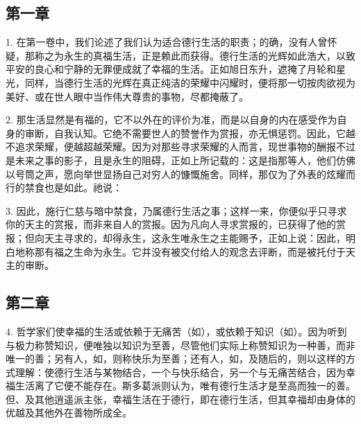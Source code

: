 \subsection{第一章}

\par

1. 在第一卷中，我们论述了我们认为适合德行生活的职责；的确，没有人曾怀疑，那称之为永生的真福生活，正是赖此而获得。德行生活的光辉如此浩大，以致平安的良心和宁静的无罪便成就了幸福的生活。正如旭日东升，遮掩了月轮和星光，同样，当德行生活的光辉在真正纯洁的荣耀中闪耀时，便将那一切按肉欲视为美好、或在世人眼中当作伟大尊贵的事物，尽都掩蔽了。\par

2. 那生活显然是有福的，它不以外在的评价为准，而是以自身的内在感受作为自身的审断，自我认知。它绝不需要世人的赞誉作为赏报，亦无惧惩罚。因此，它越不追求荣耀，便越超越荣耀。因为对那些寻求荣耀的人而言，现世事物的酬报不过是未来之事的影子，且是永生的阻碍，正如上所记载的：这是指那等人，他们仿佛以号筒之声，愿向举世显扬自己对穷人的慷慨施舍。同样，那仅为了外表的炫耀而行的禁食也是如此。祂说：\par

3. 因此，施行仁慈与暗中禁食，乃属德行生活之事；这样一来，你便似乎只寻求你的天主的赏报，而非来自人的赏报。因为凡向人寻求赏报的，已获得了他的赏报；但向天主寻求的，却得永生，这永生唯永生之主能赐予，正如上说：因此，明白地称那有福之生命为永生。它并没有被交付给人的观念去评断，而是被托付于天主的审断。\par


\subsection{第二章}

\par

4. 哲学家们使幸福的生活或依赖于无痛苦（如），或依赖于知识（如）。因为听到与极力称赞知识，便唯独以知识为至善，尽管他们实际上称赞知识为一种善，而非唯一的善；另有人，如，则称快乐为至善；还有人，如，及随后的，则以这样的方式理解：使德行生活与某物结合，一个与快乐结合，另一个与无痛苦结合，因为幸福生活离了它便不能存在。斯多葛派则认为，唯有德行生活才是至高而独一的善。但、及其他逍遥派主张，幸福生活在于德行，即在德行生活，但其幸福却由身体的优越及其他外在善物所成全。\par

